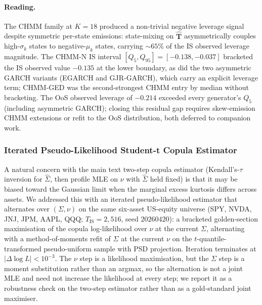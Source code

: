 \paragraph{Reading.}
The CHMM family at $K = 18$ produced a non-trivial negative leverage signal despite symmetric per-state emissions: state-mixing on $\hat{\mathbf T}$ asymmetrically couples high-$\sigma_k$ states to negative-$\mu_k$ states, carrying $\sim 65\%$ of the IS observed leverage magnitude. The CHMM-N IS interval $[Q_5, Q_{95}] = [-0.138, -0.037]$ bracketed the IS observed value $-0.135$ at the lower boundary, as did the two asymmetric GARCH variants (EGARCH and GJR-GARCH), which carry an explicit leverage term; CHMM-GED was the second-strongest CHMM entry by median without bracketing. The OoS observed leverage of $-0.214$ exceeded every generator's $Q_5$ (including asymmetric GARCH); closing this residual gap requires skew-emission CHMM extensions or refit to the OoS distribution, both deferred to companion work.

\subsubsection{Iterated Pseudo-Likelihood Student-t Copula Estimator}
\label{sec:full_tcopula_mle}

A natural concern with the main text two-step copula estimator (Kendall's-$\tau$ inversion for $\hat\Sigma$, then profile MLE on $\nu$ with $\hat\Sigma$ held fixed) is that it may be biased toward the Gaussian limit when the marginal excess kurtosis differs across assets. We addressed this with an iterated pseudo-likelihood estimator that alternates over $(\Sigma, \nu)$ on the same six-asset US-equity universe (SPY, NVDA, JNJ, JPM, AAPL, QQQ; $T_{\text{IS}} = 2{,}516$, seed $20260420$): a bracketed golden-section maximisation of the copula log-likelihood over $\nu$ at the current $\Sigma$, alternating with a method-of-moments refit of $\Sigma$ at the current $\nu$ on the $t$-quantile-transformed pseudo-uniform sample with PSD projection. Iteration terminates at $|\Delta \log L| < 10^{-3}$. The $\nu$ step is a likelihood maximisation, but the $\Sigma$ step is a moment substitution rather than an argmax, so the alternation is not a joint MLE and need not increase the likelihood at every step; we report it as a robustness check on the two-step estimator rather than as a gold-standard joint maximiser.

